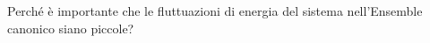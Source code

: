 \question  Perché è importante che le fluttuazioni di energia del sistema nell'Ensemble canonico siano piccole?
